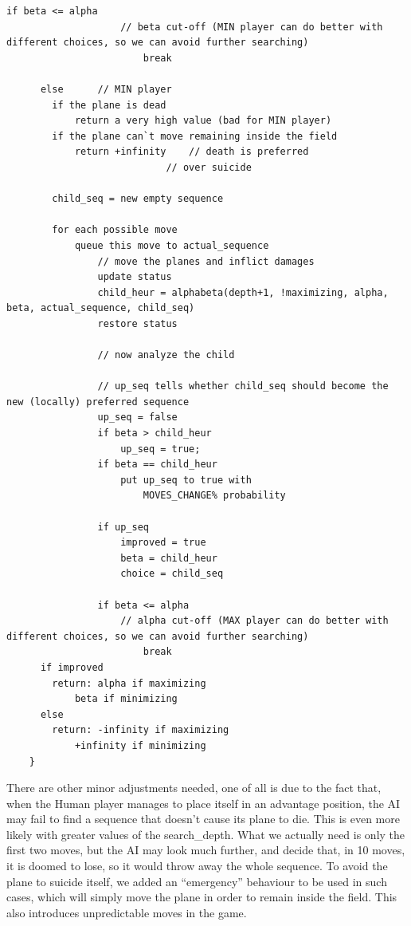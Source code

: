 {\begin{lstlisting}[frame=shadowbox,breaklines]
                if beta <= alpha
                	// beta cut-off (MIN player can do better with different choices, so we can avoid further searching)
                        break	
                                
      else		// MIN player
      	if the plane is dead
        	return a very high value (bad for MIN player)
        if the plane can`t move remaining inside the field
        	return +infinity	// death is preferred
                			// over suicide
        
        child_seq = new empty sequence
        
        for each possible move
        	queue this move to actual_sequence
                // move the planes and inflict damages
                update status
                child_heur = alphabeta(depth+1, !maximizing, alpha, beta, actual_sequence, child_seq)
                restore status
        	
                // now analyze the child
                
                // up_seq tells whether child_seq should become the new (locally) preferred sequence
                up_seq = false
                if beta > child_heur
                	up_seq = true;
                if beta == child_heur
                	put up_seq to true with
                        MOVES_CHANGE% probability
                        
                if up_seq
                	improved = true
                	beta = child_heur
                	choice = child_seq
                
                if beta <= alpha
                	// alpha cut-off (MAX player can do better with different choices, so we can avoid further searching)
                        break
      if improved
      	return:	alpha if maximizing
        	beta if minimizing
      else
      	return:	-infinity if maximizing
        	+infinity if minimizing
    }
  \end{lstlisting}
}

There are other minor adjustments needed, one of all is due to the fact that, when the Human player manages to place itself in an advantage position, the AI may fail to find a sequence that doesn't cause its plane to die. This is even more likely with greater values of the search\_depth. What we actually need is only the first two moves, but the AI may look much further, and decide that, in 10 moves, it is doomed to lose, so it would throw away the whole sequence.
To avoid the plane to suicide itself, we added an ``emergency'' behaviour to be used in such cases, which will simply move the plane in order to remain inside the field. This also introduces unpredictable moves in the game.
